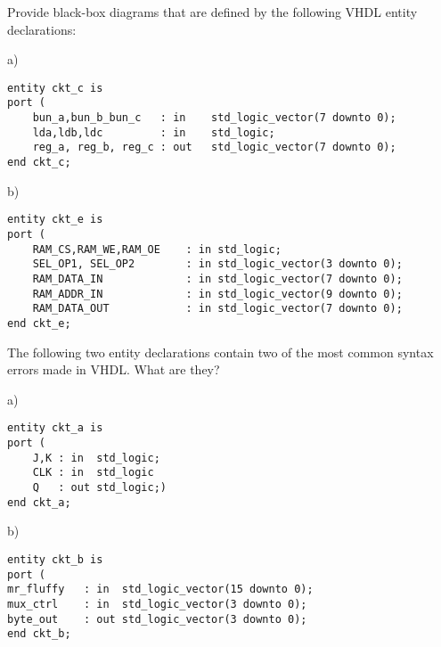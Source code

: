\begin{my_num_list}
\item Provide black-box diagrams that are defined by the following VHDL entity declarations:

\begin{minipage}{1\linewidth}
a)
\begin{lstlisting}[]
entity ckt_c is
port (
    bun_a,bun_b_bun_c   : in    std_logic_vector(7 downto 0);
    lda,ldb,ldc         : in    std_logic;
    reg_a, reg_b, reg_c : out   std_logic_vector(7 downto 0);
end ckt_c;
\end{lstlisting}
\end{minipage}
\begin{minipage}{1\linewidth}
b)
\begin{lstlisting}[]
entity ckt_e is
port ( 
    RAM_CS,RAM_WE,RAM_OE    : in std_logic;
    SEL_OP1, SEL_OP2        : in std_logic_vector(3 downto 0);
    RAM_DATA_IN             : in std_logic_vector(7 downto 0);
    RAM_ADDR_IN             : in std_logic_vector(9 downto 0);
    RAM_DATA_OUT            : in std_logic_vector(7 downto 0);
end ckt_e;
\end{lstlisting}
\end{minipage}

\item The following two entity declarations contain two of the most common syntax errors made in VHDL. What are they?

\begin{minipage}{1\linewidth}
a)
\begin{lstlisting}[framexrightmargin=-180pt]
entity ckt_a is
port (
    J,K : in  std_logic;
    CLK : in  std_logic
    Q   : out std_logic;)
end ckt_a;
\end{lstlisting}
\end{minipage}

\begin{minipage}{1\linewidth}
b)
\begin{lstlisting}[framexrightmargin=-80pt, mathescape=true]
entity ckt_b is
port (
mr_fluffy   : in  std_logic_vector(15 downto 0);
mux_ctrl    : in  std_logic_vector(3 downto 0);
byte_out    : out std_logic_vector(3 downto 0);
end ckt_b;
\end{lstlisting}
\end{minipage}
\end{my_num_list}


